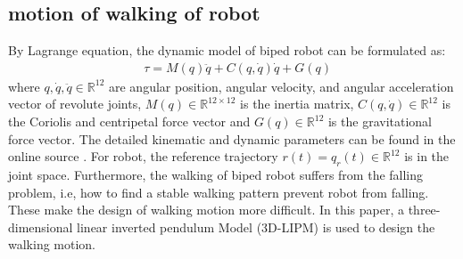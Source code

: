 \documentclass{ieeeaccess}
\begin{document}
\subsection{motion of walking of robot}
By Lagrange equation, the dynamic model of biped robot can be formulated as:
\begin{equation} \label{eq:robot} 
    \begin{split}
        & \tau = M(q)\ddot{q} + C(q,\dot{q})\dot{q} + G(q)    
    \end{split}
\end{equation}
where $q,\dot{q},\ddot{q}\in\mathbb{R}^{12}$  are angular position, angular velocity, and angular acceleration vector of revolute joints, $M(q)\in\mathbb{R}^{12\times 12}$ is the inertia matrix, $C(q,\dot{q})\in\mathbb{R}^{12}$ is the Coriolis and centripetal force vector and $G(q)\in\mathbb{R}^{12}$ is the gravitational force vector. The detailed kinematic and dynamic parameters can be found in the online source \cite{ourrobot}. For robot, the reference trajectory $r(t)=q_r(t)\in\mathbb{R}^{12}$ is in the joint space. Furthermore, the walking of biped robot suffers from the falling problem, i.e, how to find a stable walking pattern prevent robot from falling. These make the design of walking motion more difficult. In this paper, a three-dimensional linear inverted pendulum Model (3D-LIPM) \cite{kajita2001real} is used to design the walking motion.
\end{document}
